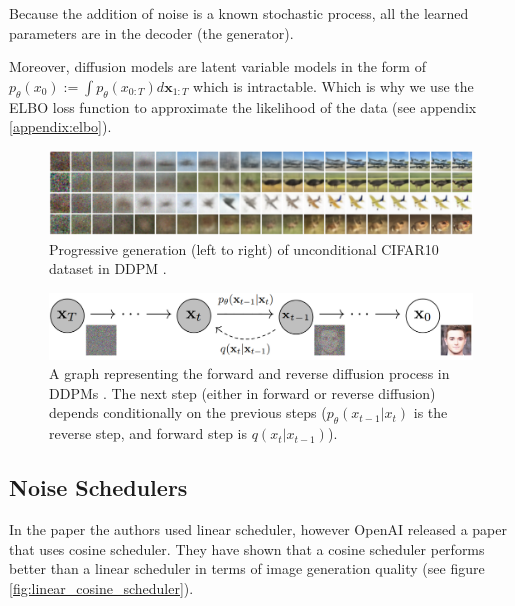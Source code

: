 Because the addition of noise is a known stochastic process, all the learned parameters are in the decoder (the generator).

Moreover, diffusion models are latent variable models in the form of $p_\theta (x_0) := \int p_\theta(x_{0:T}) d\mathbf{x}_{1:T}$ which is intractable. Which is why we use the ELBO loss function to approximate the likelihood of the data (see appendix \ref{appendix:elbo}).



\begin{figure}
    \centering
    \includegraphics[width=1\textwidth]{images/diffusion_models/ddpm_denoise.png}
    \caption{Progressive generation (left to right) of unconditional CIFAR10 dataset in DDPM \cite{ddpm}.}
\end{figure}


\begin{figure}
    \centering
    \includegraphics[width=1\textwidth]{images/diffusion_models/ddpm_process.png}
    \caption{A graph representing the forward and reverse diffusion process in DDPMs \cite{ddpm}. The next step (either in forward or reverse diffusion) depends conditionally on the previous steps ($p_\theta (x_{t-1} | x_t)$ is the reverse step, and forward step is $q(x_t | x_{t-1})$).}
    \label{fig:ddpm_process}
\end{figure}




\subsection{Noise Schedulers}

In the paper \cite{ddpm} the authors used linear scheduler, however OpenAI released a paper \cite{openai_improved_ddpm} that uses cosine scheduler. They have shown that a cosine scheduler performs better than a linear scheduler in terms of image generation quality (see figure \ref{fig:linear_cosine_scheduler}).

